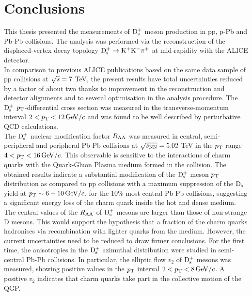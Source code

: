 \chapter{Conclusions}
\label{chap:conclusions}
This thesis presented the measurements of ${\rm D_s^+}$ meson production in pp, p-Pb and Pb-Pb collisions.
The analysis was performed via the reconstruction of the displaced-vertex decay topology ${\rm D^{+}_\mathrm{s}\to K^+ K^-\pi^+}$ at 
mid-rapidity with the ALICE detector. \\

In comparison to previous ALICE publications based on the same data sample of pp collisions at $\sqrt{s}=7$ TeV, the present
results have total uncertainties reduced by a factor of about two thanks to improvement
in the reconstruction and detector alignments and to several optimisation in the analysis procedure. The ${\rm D_s^+}$ $p_{\rm T}$-differential cross 
section was measured in the transverse-momentum interval $2<p_{\rm T}<12 \, \mathrm{GeV}/c$ and was found to 
be well described by perturbative QCD calculations.\\


The ${\rm D_s^+}$ nuclear modification factor $R_{\rm AA}$ was measured in central, semi-peripheral and peripheral Pb-Pb collisions at 
$\sqrt{s_{\rm NN}}=5.02$ TeV in the $p_{\rm T}$ range $4< p_{\rm T} <16 \, \mathrm{GeV}/c$. This observable is sensitive to the interactions of charm quarks 
with the Quark-Gluon Plasma medium formed in the collision. The obtained results indicate a
substantial modification of the ${\rm D_s^+}$ meson $p_{\rm T}$ distribution as compared to pp collisions
with a maximum suppression of the ${\rm D_s}$ yield at $p_{\rm T} \sim 6-10\, \mathrm{GeV}/c$, for the 10\% most central Pb-Pb collisions,
suggesting a significant energy loss of the charm quark inside the hot and dense medium.
The central values of the $R_{\rm AA}$ of ${\rm D_s^+}$ mesons are larger than those of non-strange D 
mesons. This would support the hypothesis that a fraction of the charm quarks hadronises via recombination 
with lighter quarks from the medium.
However, the current uncertainties need to be reduced to draw firmer conclusions.
For the first time, the anisotropies in the ${\rm D_s^+}$ azimuthal distribution were studied in semi-central Pb-Pb collisions.
In particular, the elliptic flow $v_2$ of ${\rm D_s^+}$ mesons was measured, showing positive values in the 
$p_{\rm T}$ interval $2 <p_{\rm T} <8 \, \mathrm{GeV}/c$.
A positive $v_2$ indicates that charm quarks take part in the collective motion of the QGP.\\

